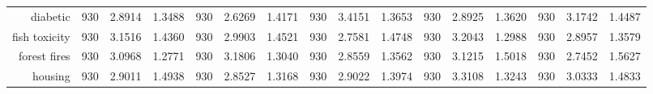 \begin{table}[htbp]
{\begin{tabular}{rccccccccccccccc}
			diabetic                            & 930                                 & 2.8914                                                                    & 1.3488          & 930                                & \cellcolor[rgb]{ .776,  .937,  .808}\textcolor[rgb]{ 0,  .38,  0}{2.6269}          & 1.4171          & 930                                & 3.4151                                                                    & 1.3653          & 930                                & 2.8925                                                                    & 1.3620          & 930                                    & 3.1742                                                                    & 1.4487          \\
			fish toxicity                       & 930                                 & 3.1516                                                                    & 1.4360          & 930                                & 2.9903                                                                             & 1.4521          & 930                                & \cellcolor[rgb]{ .776,  .937,  .808}\textcolor[rgb]{ 0,  .38,  0}{2.7581} & 1.4748          & 930                                & 3.2043                                                                    & 1.2988          & 930                                    & 2.8957                                                                    & 1.3579          \\
			forest fires                        & 930                                 & 3.0968                                                                    & 1.2771          & 930                                & 3.1806                                                                             & 1.3040          & 930                                & 2.8559                                                                    & 1.3562          & 930                                & 3.1215                                                                    & 1.5018          & 930                                    & \cellcolor[rgb]{ .776,  .937,  .808}\textcolor[rgb]{ 0,  .38,  0}{2.7452} & 1.5627          \\
			housing                             & 930                                 & 2.9011                                                                    & 1.4938          & 930                                & \cellcolor[rgb]{ .776,  .937,  .808}\textcolor[rgb]{ 0,  .38,  0}{2.8527}          & 1.3168          & 930                                & 2.9022                                                                    & 1.3974          & 930                                & 3.3108                                                                    & 1.3243          & 930                                    & 3.0333                                                                    & 1.4833          \\

\end{tabular}}
\end{table}
